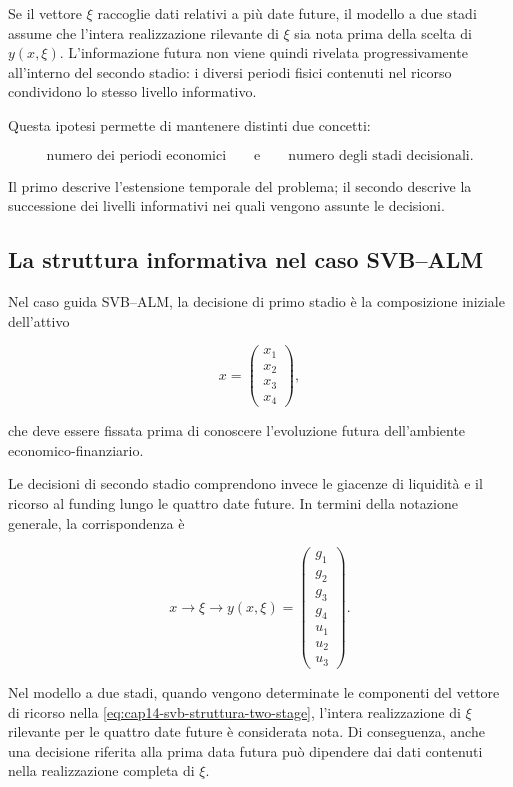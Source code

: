 Se il vettore $\xi$ raccoglie dati relativi a pi\`u date future, il modello
a due stadi assume che l'intera realizzazione rilevante di $\xi$ sia nota
prima della scelta di $y(x,\xi)$. L'informazione futura non viene quindi
rivelata progressivamente all'interno del secondo stadio: i diversi periodi
fisici contenuti nel ricorso condividono lo stesso livello informativo.

Questa ipotesi permette di mantenere distinti due concetti:

\[
\text{numero dei periodi economici}
\qquad\text{e}\qquad
\text{numero degli stadi decisionali}.
\]

Il primo descrive l'estensione temporale del problema; il secondo descrive
la successione dei livelli informativi nei quali vengono assunte le
decisioni.

\subsection{La struttura informativa nel caso SVB--ALM}

Nel caso guida SVB--ALM, la decisione di primo stadio \`e la composizione
iniziale dell'attivo

\[
x=
\begin{pmatrix}
x_1\\
x_2\\
x_3\\
x_4
\end{pmatrix},
\]

\noindent che deve essere fissata prima di conoscere l'evoluzione futura
dell'ambiente economico-finanziario.

Le decisioni di secondo stadio comprendono invece le giacenze di liquidit\`a
e il ricorso al funding lungo le quattro date future. In termini della
notazione generale, la corrispondenza \`e

\begin{equation}
x
\longrightarrow
\xi
\longrightarrow
y(x,\xi)
=
\begin{pmatrix}
g_1\\
g_2\\
g_3\\
g_4\\
u_1\\
u_2\\
u_3
\end{pmatrix}.
\label{eq:cap14-svb-struttura-two-stage}
\end{equation}

Nel modello a due stadi, quando vengono determinate le componenti del
vettore di ricorso nella
\eqref{eq:cap14-svb-struttura-two-stage}, l'intera realizzazione di $\xi$
rilevante per le quattro date future \`e considerata nota. Di conseguenza,
anche una decisione riferita alla prima data futura pu\`o dipendere dai dati
contenuti nella realizzazione completa di $\xi$.

